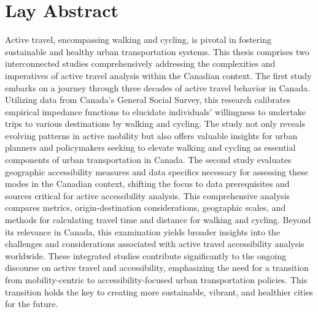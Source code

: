 \documentclass[
11pt, %
oneside, %
english, %
singlespacing, %
]{macthesis} %
\def\blankpage{%
      \clearpage%
      \thispagestyle{empty}%
      \addtocounter{page}{-1}%
      \null%
      \clearpage}
\begin{document}
\section*{Lay Abstract}
  Active travel, encompassing walking and cycling, is pivotal in fostering sustainable and healthy urban transportation systems. This thesis comprises two interconnected studies comprehensively addressing the complexities and imperatives of active travel analysis within the Canadian context. The first study embarks on a journey through three decades of active travel behavior in Canada. Utilizing data from Canada's General Social Survey, this research calibrates empirical impedance functions to elucidate individuals' willingness to undertake trips to various destinations by walking and cycling. The study not only reveals evolving patterns in active mobility but also offers valuable insights for urban planners and policymakers seeking to elevate walking and cycling as essential components of urban transportation in Canada. The second study evaluates geographic accessibility measures and data specifics necessary for assessing these modes in the Canadian context, shifting the focus to data prerequisites and sources critical for active accessibility analysis. This comprehensive analysis compares metrics, origin-destination considerations, geographic scales, and methods for calculating travel time and distance for walking and cycling. Beyond its relevance in Canada, this examination yields broader insights into the challenges and considerations associated with active travel accessibility analysis worldwide. These integrated studies contribute significantly to the ongoing discourse on active travel and accessibility, emphasizing the need for a transition from mobility-centric to accessibility-focused urban transportation policies. This transition holds the key to creating more sustainable, vibrant, and healthier cities for the future.
\blankpage
\clearpage


\end{document}

